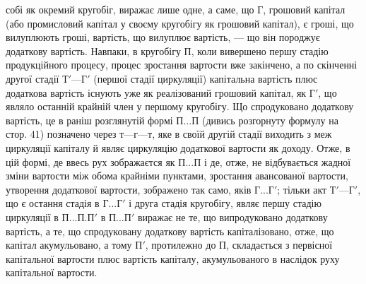 \parcont{}  %
собі як окремий кругобіг, виражає лише одне, а саме, що Г, грошовий
капітал (або промисловий капітал у своєму кругобігу як грошовий
капітал), є гроші, що вилуплюють гроші, вартість, що вилуплює вартість,
— що він породжує додаткову вартість. Навпаки, в кругобігу П,
коли вивершено першу стадію продукційного процесу, процес зростання
вартости вже закінчено, а по скінченні другої стадії $Т' — Г'$ (першої
стадії циркуляції) капітальна вартість плюс додаткова вартість існують
уже як реалізований грошовий капітал, як $Г'$, що являло останній крайній
член у першому кругобігу. Що спродуковано додаткову вартість, це в
раніш розглянутій формі $П... П$ (дивись розгорнуту формулу на стор.
41) позначено через $т — г — т$, яке в своїй другій стадії виходить
з меж циркуляції капіталу й являє циркуляцію додаткової вартости як
доходу. Отже, в цій формі, де ввесь рух зображаєтся як $П... П$ і де,
отже, не відбувається жадної зміни вартости між обома крайніми пунктами,
зростання авансованої вартости, утворення додаткової вартости, зображено
так само, яків $Г... Г'$; тільки акт $Т' — Г'$, що є остання стадія в $Г... Г'$
і друга стадія кругобігу, являє першу стадію циркуляції в $П. . . П.

П'$ в $П.. . П'$ виражає не те, що випродуковано додаткову вартість, а
те, що спродуковану додаткову вартість капіталізовано, отже, що капітал
акумульовано, а тому $П'$, протилежно до П, складається з первісної капітальної
вартости плюс вартість капіталу, акумульованого в наслідок руху
капітальної вартости.

